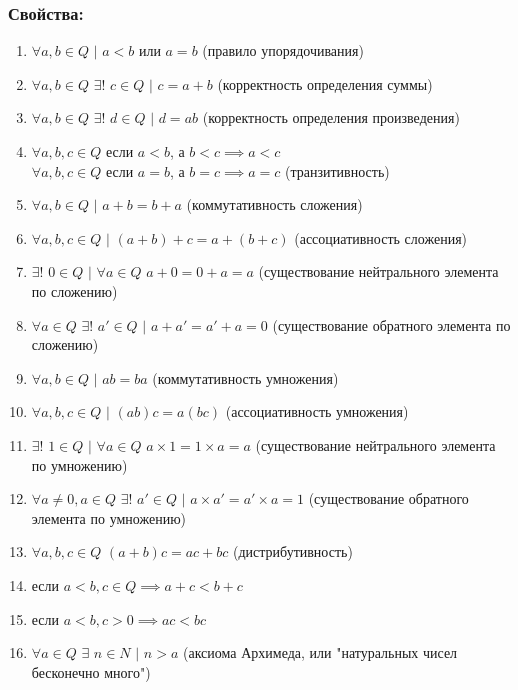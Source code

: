 \documentclass[12pt]{article}
\begin{document}
    \subsubsection*{Свойства:}
    \begin{enumerate}
        \item $\forall a,b \in Q$ $|$ $a < b$ или $a = b$ (правило упорядочивания)
        \item $\forall a,b \in Q$ $\exists!$ $c \in Q$ $|$ $ c = a + b$ (корректность определения суммы)
        \item $\forall a,b \in Q$ $\exists!$ $d \in Q$ $|$ $ d = ab$ (корректность определения произведения)
        \item $\forall a,b,c \in Q$ если $a < b$, а $b < c \implies a < c$\\$\forall a,b,c \in Q$ если $a = b$, а $b = c \implies a = c$ (транзитивность)
        \item $\forall a,b \in Q$ $|$ $a+b=b+a$ (коммутативность сложения)
        \item $\forall a,b,c \in Q$ $|$ $(a+b)+c = a+(b+c)$ (ассоциативность сложения)
        \item $\exists!$ $0 \in Q$ $|$ $\forall a \in Q$ $a+0 = 0+a = a$ (существование нейтрального элемента по сложению)
        \item $\forall a \in Q$ $\exists!$ $a' \in Q$ $|$ $a+a'=a'+a = 0$ (существование обратного элемента по сложению)
        \item $\forall a,b \in Q$ $|$ $ab=ba$ (коммутативность умножения)
        \item $\forall a,b,c \in Q$ $|$ $(ab)c = a(bc)$ (ассоциативность умножения)
        \item $\exists!$ $1 \in Q$ $|$ $\forall a \in Q$ $a \times 1 = 1 \times a = a$ (существование нейтрального элемента по умножению)
        \item $\forall a \ne 0, a \in Q$ $\exists!$ $a' \in Q$ $|$ $a \times a'=a' \times a = 1$ (существование обратного элемента по умножению)
        \item $\forall a,b,c \in Q$ $(a + b)c = ac + bc$ (дистрибутивность)
        \item если $a < b, c \in Q \implies a+c < b+c$
        \item если $a < b, c > 0 \implies ac < bc$
        \item $\forall a \in Q$ $\exists$ $n \in N$ $|$ $n > a$ (аксиома Архимеда, или "натуральных чисел бесконечно много")
    \end{enumerate}
\end{document}
